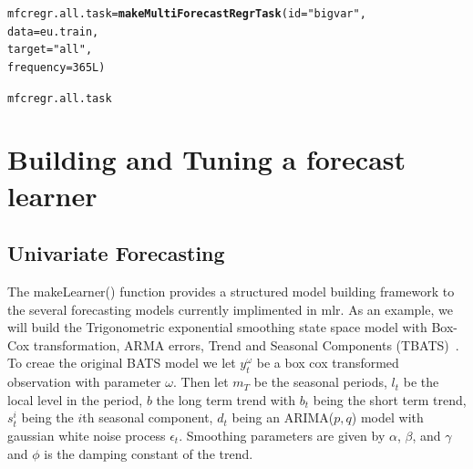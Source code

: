 \documentclass{article}\usepackage[]{graphicx}\usepackage[]{color}
\makeatletter
\newcommand{\hlnum}[1]{\textcolor[rgb]{0.686,0.059,0.569}{#1}}%
\newcommand{\hlstr}[1]{\textcolor[rgb]{0.192,0.494,0.8}{#1}}%
\newcommand{\hlstd}[1]{\textcolor[rgb]{0.345,0.345,0.345}{#1}}%
\newcommand{\hlkwb}[1]{\textcolor[rgb]{0.69,0.353,0.396}{#1}}%
\newcommand{\hlkwc}[1]{\textcolor[rgb]{0.333,0.667,0.333}{#1}}%
\newcommand{\hlkwd}[1]{\textcolor[rgb]{0.737,0.353,0.396}{\textbf{#1}}}%
\newenvironment{kframe}{%
 \def\at@end@of@kframe{}%
 \ifinner\ifhmode%
  \def\at@end@of@kframe{\end{minipage}}%
  \begin{minipage}{\columnwidth}%
 \fi\fi%
 \def\FrameCommand##1{\hskip\@totalleftmargin \hskip-\fboxsep
 \colorbox{shadecolor}{##1}\hskip-\fboxsep
     \hskip-\linewidth \hskip-\@totalleftmargin \hskip\columnwidth}%
 \MakeFramed {\advance\hsize-\width
   \@totalleftmargin\z@ \linewidth\hsize
   \@setminipage}}%
 {\par\unskip\endMakeFramed%
 \at@end@of@kframe}
\newenvironment{knitrout}{}{} %
\theoremstyle{definition}
\newcommand\code{\@codex}
\def\@codex#1{{\normalfont\ttfamily\hyphenchar\font=-1 #1}}
\newcommand{\pkg}[1]{{\fontseries{b}\selectfont #1}}
\makeatother
\begin{document}
\begin{knitrout}
\color{fgcolor}\begin{kframe}
\begin{alltt}
\hlstd{mfcregr.all.task} \hlkwb{=} \hlkwd{makeMultiForecastRegrTask}\hlstd{(}\hlkwc{id} \hlstd{=} \hlstr{"bigvar"}\hlstd{,}
                                             \hlkwc{data} \hlstd{= eu.train,}
                                             \hlkwc{target} \hlstd{=} \hlstr{"all"}\hlstd{,}
                                             \hlkwc{frequency} \hlstd{=} \hlnum{365L}\hlstd{)}
\end{alltt}


{\ttfamily\noindent\bfseries{}}\begin{alltt}
\hlstd{mfcregr.all.task}
\end{alltt}


{\ttfamily\noindent\bfseries\color{errorcolor}{\#\# Error in eval(expr, envir, enclos): object 'mfcregr.all.task' not found}}\end{kframe}
\end{knitrout}

\section{Building and Tuning a forecast learner}

\subsection{Univariate Forecasting}

The \code{makeLearner()} function provides a structured model building framework to the several forecasting models currently implimented in \pkg{mlr}. As an example, we will build the Trigonometric exponential smoothing state space model with Box-Cox transformation, ARMA errors, Trend and Seasonal Components (TBATS)~\cite{tbats}. To creae the original BATS model we let $y_t^{\omega}$ be a box cox transformed observation with parameter $\omega$. Then let $m_T$ be the seasonal periods, $l_t$ be the local level in the period, $b$ the long term trend with $b_t$ being the short term trend, $s_t^i$ being the $i$th seasonal component, $d_t$ being an ARIMA($p,q$) model with gaussian white noise process $\epsilon_t$. Smoothing parameters are given by $\alpha$, $\beta$, and $\gamma$ and $\phi$ is the damping constant of the trend.
\end{document}
